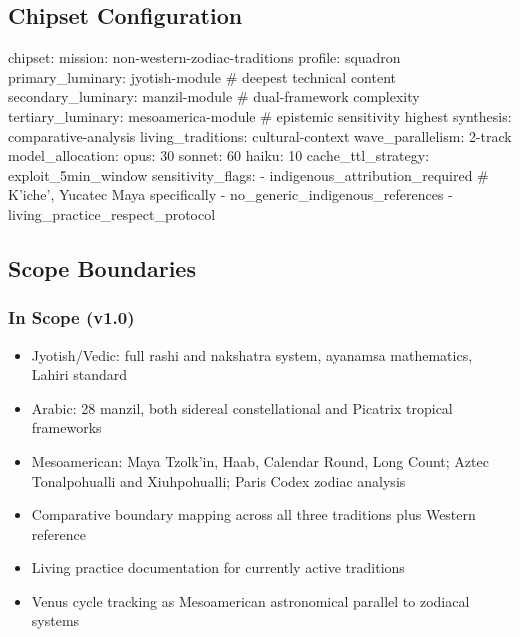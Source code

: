 \documentclass[11pt,letterpaper]{article}
\begin{document}
\subsection{Chipset Configuration}

\begin{asciibox}
chipset:
  mission: non-western-zodiac-traditions
  profile: squadron
  primary_luminary: jyotish-module     # deepest technical content
  secondary_luminary: manzil-module    # dual-framework complexity
  tertiary_luminary: mesoamerica-module # epistemic sensitivity highest
  synthesis: comparative-analysis
  living_traditions: cultural-context
  wave_parallelism: 2-track
  model_allocation:
    opus: 30%
    sonnet: 60%
    haiku: 10%
  cache_ttl_strategy: exploit_5min_window
  sensitivity_flags:
    - indigenous_attribution_required   # K'iche', Yucatec Maya specifically
    - no_generic_indigenous_references
    - living_practice_respect_protocol
\end{asciibox}

\subsection{Scope Boundaries}

\subsubsection*{In Scope (v1.0)}
\begin{itemize}[leftmargin=1.5em]
  \item Jyotish/Vedic: full rashi and nakshatra system, ayanamsa mathematics, Lahiri standard
  \item Arabic: 28 manzil, both sidereal constellational and Picatrix tropical frameworks
  \item Mesoamerican: Maya Tzolk'in, Haab, Calendar Round, Long Count; Aztec Tonalpohualli and Xiuhpohualli; Paris Codex zodiac analysis
  \item Comparative boundary mapping across all three traditions plus Western reference
  \item Living practice documentation for currently active traditions
  \item Venus cycle tracking as Mesoamerican astronomical parallel to zodiacal systems
\end{itemize}
\end{document}
